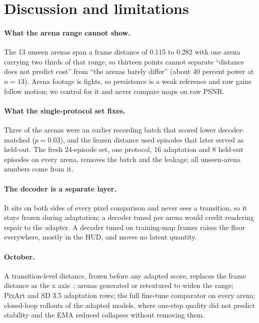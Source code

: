 
\section{Discussion and limitations}
\label{sec:limits}

\paragraph{What the arena range cannot show.} The 13 unseen arenas span a frame distance of 0.115 to 0.282 with one arena carrying two thirds of that range, so thirteen points cannot separate ``distance does not predict cost'' from ``the arenas barely differ'' (about 40 percent power at $n=13$). Arena footage is fights, so persistence is a weak reference and raw gains follow motion; we control for it and never compare maps on raw PSNR. %
\paragraph{What the single-protocol set fixes.} Three of the arenas were an earlier recording batch that scored lower decoder-matched ($p=0.03$), and the frozen distance used episodes that later served as held-out. The fresh 24-episode set, one protocol, 16 adaptation and 8 held-out episodes on every arena, removes the batch and the leakage; all unseen-arena numbers come from it. %
\paragraph{The decoder is a separate layer.} It sits on both sides of every pixel comparison and never sees a transition, so it stays frozen during adaptation; a decoder tuned per arena would credit rendering repair to the adapter. A decoder tuned on training-map frames raises the floor everywhere, mostly in the HUD, and moves no latent quantity. %
\paragraph{October.} A transition-level distance, frozen before any adapted score, replaces the frame distance as the x axis~\citep{mensink2021factors,westny2026latent}; arenas generated or retextured to widen the range; PixArt and SD 3.5 adaptation rows; the full fine-tune comparator on every arena; closed-loop rollouts of the adapted models, where one-step quality did not predict stability and the EMA reduced collapses without removing them. %

